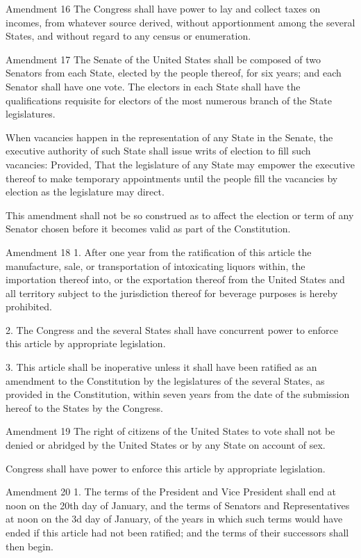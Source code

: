 \documentclass[12pt,a4paper]{article}
\begin{document}
Amendment 16
The Congress shall have power to lay and collect taxes on incomes, from
whatever source derived, without apportionment among the several States, and
without regard to any census or enumeration.

Amendment 17
The Senate of the United States shall be composed of two Senators from each
State, elected by the people thereof, for six years; and each Senator shall
have one vote. The electors in each State shall have the qualifications
requisite for electors of the most numerous branch of the State legislatures.

When vacancies happen in the representation of any State in the Senate, the
executive authority of such State shall issue writs of election to fill such
vacancies: Provided, That the legislature of any State may empower the
executive thereof to make temporary appointments until the people fill the
vacancies by election as the legislature may direct.

This amendment shall not be so construed as to affect the election or term of
any Senator chosen before it becomes valid as part of the Constitution.

Amendment 18
1. After one year from the ratification of this article the manufacture, sale,
or transportation of intoxicating liquors within, the importation thereof into,
or the exportation thereof from the United States and all territory subject to
the jurisdiction thereof for beverage purposes is hereby prohibited.

2. The Congress and the several States shall have concurrent power to enforce
this article by appropriate legislation.

3. This article shall be inoperative unless it shall have been ratified as an
amendment to the Constitution by the legislatures of the several States, as
provided in the Constitution, within seven years from the date of the
submission hereof to the States by the Congress.

Amendment 19
The right of citizens of the United States to vote shall not be denied or
abridged by the United States or by any State on account of sex.

Congress shall have power to enforce this article by appropriate legislation.

Amendment 20
1. The terms of the President and Vice President shall end at noon on the 20th
day of January, and the terms of Senators and Representatives at noon on the 3d
day of January, of the years in which such terms would have ended if this
article had not been ratified; and the terms of their successors shall then
begin.
\end{document}
